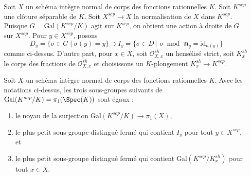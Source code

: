 \noindent
Soit $X$ un schéma intègre normal de corps des fonctions rationnelles $K$.
Soit $K^{sep}$ une clôture séparable de $K$.
Soit $X^{sep} \to X$ la normalisation de $X$ dans $K^{sep}$.
Puisque $G = \text{Gal}(K^{sep}/K)$ agit sur $K^{sep}$,
on obtient une action à droite de $G$ sur $X^{sep}$.
Pour $y \in X^{sep}$, posons
$$
D_y = \{\sigma \in G \mid \sigma(y) = y\} \supset
I_y = \{\sigma \in D \mid \sigma \bmod \mathfrak m_y =
\text{id}_{\kappa(y)} \}
$$
comme ci-dessus. D'autre part, pour $x \in X$,
soit $\mathcal{O}_{X, x}^{sh}$ un hensélisé strict,
soit $K_x^{sh}$ le corps des fractions de $\mathcal{O}_{X, x}^{sh}$
et choisissons un $K$-plongement $K_x^{sh} \to K^{sep}$.

\begin{lemma}
\label{lemma-normal-pione-quotient-inertia}
Soit $X$ un schéma intègre normal de corps des fonctions rationnelles $K$.
Avec les notations ci-dessus, les trois sous-groupes suivants de
$\text{Gal}(K^{sep}/K) = \pi_1(\Spec(K))$
sont égaux :
\begin{enumerate}
\item le noyau de la surjection
$\text{Gal}(K^{sep}/K) \longrightarrow \pi_1(X)$,
\item le plus petit sous-groupe distingué fermé qui contient $I_y$
pour tout $y \in X^{sep}$, et
\item le plus petit sous-groupe distingué fermé qui contient
$\text{Gal}(K^{sep}/K_x^{sh})$ pour tout $x \in  X$.
\end{enumerate}
\end{lemma}

